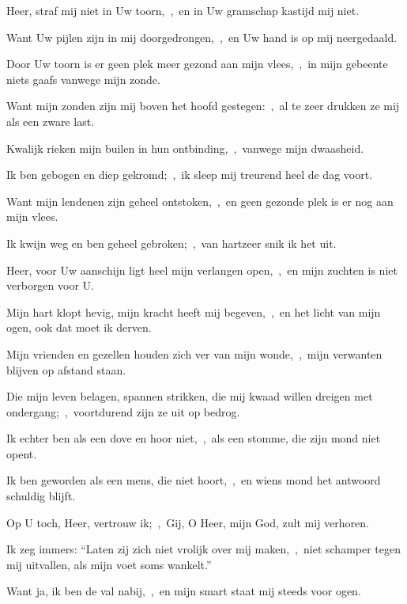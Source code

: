 \documentclass[12pt,twoside,a5paper]{article}
\begin{document}
\begin{halfparskip}

   Heer, straf mij niet in Uw toorn,~\sep\ en in Uw gramschap kastijd mij niet.


  Want Uw pijlen zijn in mij doorgedrongen,~\sep\ en Uw hand is op mij neergedaald.

  Door Uw toorn is er geen plek meer gezond aan mijn vlees,~\sep\ in mijn gebeente niets gaafs vanwege mijn zonde.

  Want mijn zonden zijn mij boven het hoofd gestegen:~\sep\ al te zeer drukken ze mij als een zware last.

  Kwalijk rieken mijn builen in hun ontbinding,~\sep\ vanwege mijn dwaasheid.

  Ik ben gebogen en diep gekromd;~\sep\ ik sleep mij treurend heel de dag voort.

  Want mijn lendenen zijn geheel ontstoken,~\sep\ en geen gezonde plek is er nog aan mijn vlees.

  Ik kwijn weg en ben geheel gebroken;~\sep\ van hartzeer snik ik het uit.

  Heer, voor Uw aanschijn ligt heel mijn verlangen open,~\sep\ en mijn zuchten is niet verborgen voor U.

  Mijn hart klopt hevig, mijn kracht heeft mij begeven,~\sep\ en het licht van mijn ogen, ook dat moet ik derven.

  Mijn vrienden en gezellen houden zich ver van mijn wonde,~\sep\ mijn verwanten blijven op afstand staan.

  Die mijn leven belagen, spannen strikken, die mij kwaad willen dreigen met ondergang;~\sep\ voortdurend zijn ze uit op bedrog.

  Ik echter ben als een dove en hoor niet,~\sep\ als een stomme, die zijn mond niet opent.

  Ik ben geworden als een mens, die niet hoort,~\sep\ en wiens mond het antwoord schuldig blijft.

  Op U toch, Heer, vertrouw ik;~\sep\ Gij, O Heer, mijn God, zult mij verhoren.

  Ik zeg immers: ``Laten zij zich niet vrolijk over mij maken,~\sep\ niet schamper tegen mij uitvallen, als mijn voet soms wankelt.''

  Want ja, ik ben de val nabij,~\sep\ en mijn smart staat mij steeds voor ogen.


\end{halfparskip}
\end{document}
